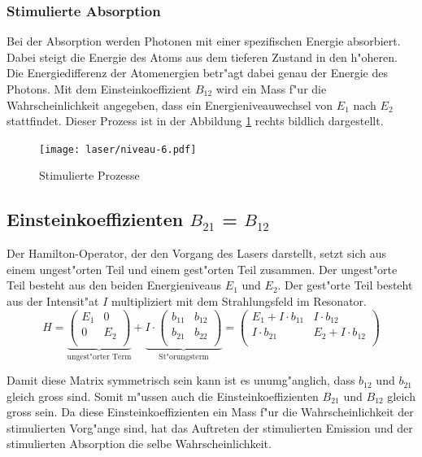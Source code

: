 \begin{refsection}
\subsubsection{Stimulierte Absorption}
%
Bei der Absorption werden Photonen mit einer spezifischen Energie absorbiert.
Dabei steigt die Energie des Atoms aus dem tieferen Zustand in den
h"oheren.
Die Energiedifferenz der Atomenergien betr"agt dabei genau der Energie des
Photons.
Mit dem Einsteinkoeffizient $B_{12}$ wird ein Mass f"ur die
Wahrscheinlichkeit angegeben, dass ein Energieniveauwechsel von $E_1$ nach
$E_2$ stattfindet.
Dieser Prozess ist in der Abbildung \ref{Stimulierte Prozesse} rechts bildlich
dargestellt.

\begin{figure}
\centering
\texttt{[image: laser/niveau-6.pdf]}
\caption{Stimulierte Prozesse}
\label{Stimulierte Prozesse}
\end{figure}

\subsection{Einsteinkoeffizienten $B_{21}$ = $B_{12}$
\label{B21=B12}}
Der Hamilton-Operator, der den Vorgang des Lasers darstellt,
setzt sich aus einem ungest"orten Teil und einem gest"orten Teil zusammen.
Der ungest"orte Teil besteht aus den beiden Energieniveaus $E_1$ und $E_2$.
Der gest"orte Teil besteht aus der Intensit"at $I$
multipliziert mit dem Strahlungsfeld im Resonator.
\[
H =\underbrace{\begin{pmatrix}
E_1 & 0  \\
0   & E_2 \\
\end{pmatrix}}_{\text{ungest"orter Term}}
+ \underbrace{I\cdot \begin{pmatrix}
b_{11} & b_{12}  \\
b_{21} & b_{22} \\
\end{pmatrix}}_{\text{St"orungsterm}}
=\begin{pmatrix}
E_1+ I\cdot b_{11} & I\cdot b_{12}  \\
I\cdot b_{21} & E_2+I\cdot b_{12} \\
\end{pmatrix}
\]

Damit diese Matrix symmetrisch sein kann ist es unumg"anglich, dass $b_{12}$
und $b_{21}$ gleich gross sind.
Somit m"ussen auch die Einsteinkoeffizienten $B_{21}$ und $B_{12}$
gleich gross sein.
Da diese Einsteinkoeffizienten ein Mass f"ur die Wahrscheinlichkeit der
stimulierten Vorg"ange sind, hat das Auftreten der stimulierten Emission und
der stimulierten Absorption die selbe Wahrscheinlichkeit.


\end{refsection}
